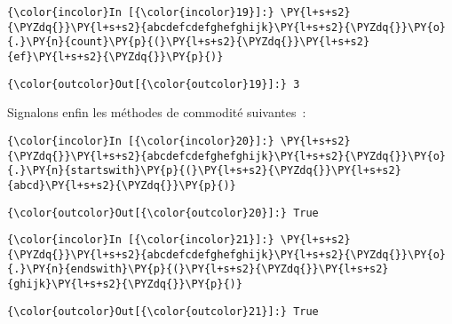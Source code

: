     \begin{Verbatim}[commandchars=\\\{\},frame=single,framerule=0.3mm,rulecolor=\color{cellframecolor}]
{\color{incolor}In [{\color{incolor}19}]:} \PY{l+s+s2}{\PYZdq{}}\PY{l+s+s2}{abcdefcdefghefghijk}\PY{l+s+s2}{\PYZdq{}}\PY{o}{.}\PY{n}{count}\PY{p}{(}\PY{l+s+s2}{\PYZdq{}}\PY{l+s+s2}{ef}\PY{l+s+s2}{\PYZdq{}}\PY{p}{)}
\end{Verbatim}


\begin{Verbatim}[commandchars=\\\{\},frame=single,framerule=0.3mm,rulecolor=\color{cellframecolor}]
{\color{outcolor}Out[{\color{outcolor}19}]:} 3
\end{Verbatim}
            
    Signalons enfin les méthodes de commodité suivantes~:

    \begin{Verbatim}[commandchars=\\\{\},frame=single,framerule=0.3mm,rulecolor=\color{cellframecolor}]
{\color{incolor}In [{\color{incolor}20}]:} \PY{l+s+s2}{\PYZdq{}}\PY{l+s+s2}{abcdefcdefghefghijk}\PY{l+s+s2}{\PYZdq{}}\PY{o}{.}\PY{n}{startswith}\PY{p}{(}\PY{l+s+s2}{\PYZdq{}}\PY{l+s+s2}{abcd}\PY{l+s+s2}{\PYZdq{}}\PY{p}{)}
\end{Verbatim}


\begin{Verbatim}[commandchars=\\\{\},frame=single,framerule=0.3mm,rulecolor=\color{cellframecolor}]
{\color{outcolor}Out[{\color{outcolor}20}]:} True
\end{Verbatim}
            
    \begin{Verbatim}[commandchars=\\\{\},frame=single,framerule=0.3mm,rulecolor=\color{cellframecolor}]
{\color{incolor}In [{\color{incolor}21}]:} \PY{l+s+s2}{\PYZdq{}}\PY{l+s+s2}{abcdefcdefghefghijk}\PY{l+s+s2}{\PYZdq{}}\PY{o}{.}\PY{n}{endswith}\PY{p}{(}\PY{l+s+s2}{\PYZdq{}}\PY{l+s+s2}{ghijk}\PY{l+s+s2}{\PYZdq{}}\PY{p}{)}
\end{Verbatim}


\begin{Verbatim}[commandchars=\\\{\},frame=single,framerule=0.3mm,rulecolor=\color{cellframecolor}]
{\color{outcolor}Out[{\color{outcolor}21}]:} True
\end{Verbatim}
            
